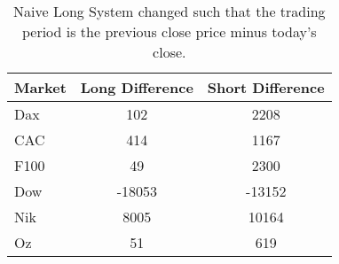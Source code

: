 \begin{table}[ht]
\centering
\caption[Naive Long System - Close to Close]{Naive Long System changed such that the trading period is the previous close price minus today's close.} 
\label{tab:aroon_results_sloss_diff}
\begin{tabular}{lcc}
  \toprule Market & Long Difference & Short Difference \\ 
  \midrule Dax & 102 & 2208 \\ 
  CAC & 414 & 1167 \\ 
  F100 & 49 & 2300 \\ 
  Dow & -18053 & -13152 \\ 
  Nik & 8005 & 10164 \\ 
  Oz & 51 & 619 \\ 
   \bottomrule \end{tabular}
\end{table}
